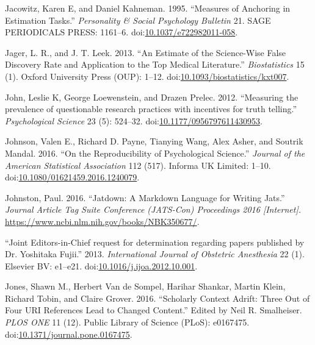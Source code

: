 \documentclass[a5paper]{book}
\begin{document}
\hypertarget{ref-doi:10.1037ux2fe722982011-058}{}
Jacowitz, Karen E, and Daniel Kahneman. 1995. ``Measures of Anchoring in
Estimation Tasks.'' \emph{Personality \& Social Psychology Bulletin} 21.
SAGE PERIODICALS PRESS: 1161--6.
doi:\href{https://doi.org/10.1037/e722982011-058}{10.1037/e722982011-058}.

\hypertarget{ref-doi:10.1093ux2fbiostatisticsux2fkxt007}{}
Jager, L. R., and J. T. Leek. 2013. ``An Estimate of the Science-Wise
False Discovery Rate and Application to the Top Medical Literature.''
\emph{Biostatistics} 15 (1). Oxford University Press (OUP): 1--12.
doi:\href{https://doi.org/10.1093/biostatistics/kxt007}{10.1093/biostatistics/kxt007}.

\hypertarget{ref-doi:10.1177ux2f0956797611430953}{}
John, Leslie K, George Loewenstein, and Drazen Prelec. 2012. ``Measuring
the prevalence of questionable research practices with incentives for
truth telling.'' \emph{Psychological Science} 23 (5): 524--32.
doi:\href{https://doi.org/10.1177/0956797611430953}{10.1177/0956797611430953}.

\hypertarget{ref-doi:10.1080ux2f01621459.2016.1240079}{}
Johnson, Valen E., Richard D. Payne, Tianying Wang, Alex Asher, and
Soutrik Mandal. 2016. ``On the Reproducibility of Psychological
Science.'' \emph{Journal of the American Statistical Association} 112
(517). Informa UK Limited: 1--10.
doi:\href{https://doi.org/10.1080/01621459.2016.1240079}{10.1080/01621459.2016.1240079}.

\hypertarget{ref-jatdown}{}
Johnston, Paul. 2016. ``Jatdown: A Markdown Language for Writing Jats.''
\emph{Journal Article Tag Suite Conference (JATS-Con) Proceedings 2016
{[}Internet{]}.} \url{https://www.ncbi.nlm.nih.gov/books/NBK350677/}.

\hypertarget{ref-doi:10.1016ux2fj.ijoa.2012.10.001}{}
``Joint Editors-in-Chief request for determination regarding papers
published by Dr. Yoshitaka Fujii.'' 2013. \emph{International Journal of
Obstetric Anesthesia} 22 (1). Elsevier BV: e1--e21.
doi:\href{https://doi.org/10.1016/j.ijoa.2012.10.001}{10.1016/j.ijoa.2012.10.001}.

\hypertarget{ref-doi:10.1371ux2fjournal.pone.0167475}{}
Jones, Shawn M., Herbert Van de Sompel, Harihar Shankar, Martin Klein,
Richard Tobin, and Claire Grover. 2016. ``Scholarly Context Adrift:
Three Out of Four URI References Lead to Changed Content.'' Edited by
Neil R. Smalheiser. \emph{PLOS ONE} 11 (12). Public Library of Science
(PLoS): e0167475.
doi:\href{https://doi.org/10.1371/journal.pone.0167475}{10.1371/journal.pone.0167475}.
\end{document}
